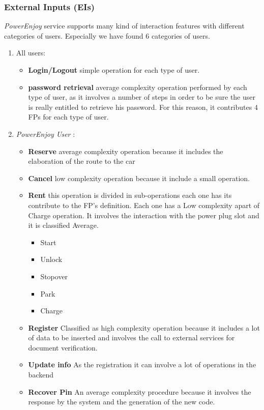 \documentclass[english]{article}
\newcommand{\powerenjoy}{\textit{PowerEnjoy }}
\newcommand{\powerenjoyuser}{\textit{PowerEnjoy User }}
\begin{document}
\subsubsection{External Inputs (EIs)}
\powerenjoy service supports many kind of interaction features with different categories of users.
Especially we have found 6 categories of users.
\begin{enumerate}
\item All users:
\begin{itemize}
\item \textbf{Login/Logout} simple operation for each type of user.
\item  \textbf{password retrieval} average complexity operation performed by each type of user, as it involves a number of steps in order to be sure the user is really entitled to retrieve his password. For this reason, it contributes 4 FPs for each type of user.
\end{itemize}
\item \powerenjoyuser:
\begin{itemize}
\item \textbf{Reserve} average complexity operation because it includes the elaboration of the route to the car
\item \textbf{Cancel} low complexity operation because it include a small operation.
\item \textbf{Rent} this operation is divided in sub-operations each one has its contribute to the FP's definition. Each one has a Low complexity apart of Charge operation. It involves the interaction with the power plug slot and it is classified Average.
	\begin{itemize}
		\item Start 
		\item Unlock
		\item Stopover
		\item Park
		\item Charge
	\end{itemize}
\item\textbf{Register} Classified as high complexity operation because it includes a lot of data to be inserted and involves the call to external services for document verification.
\item\textbf{Update info} As the registration it can involve a lot of operations in the backend
\item\textbf{Recover Pin} An average complexity procedure because it involves the response by the system and the generation of the new code.

\end{itemize}
\end{enumerate}
\end{document}

